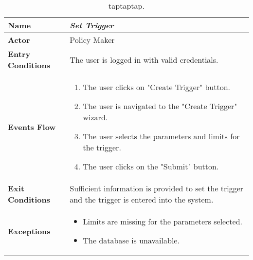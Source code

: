 
\begin{table}
\centering
\caption{\label{tab:addOne{table_counter}}taptaptap.}
\renewcommand{\arraystretch}{1.25}
\begin{tabular}{|l|>{\raggedright\arraybackslash}m{12cm}|}

    \hline
    \textbf{Name} & \textit{Set Trigger}\\
    \hline
   	\textbf{Actor} & Policy Maker\\
    \hline
    \textbf{Entry Conditions} & The user is logged in with valid credentials.\\
    \hline
    \textbf{Events Flow} & 
    \begin{enumerate}
	    \item The user clicks on "Create Trigger" button.
    	\item The user is navigated to the "Create Trigger" wizard.
    	\item The user selects the parameters and limits for the trigger.
    	\item The user clicks on the "Submit" button.
    \end{enumerate} \\ \hline
    \textbf{Exit Conditions} & Sufficient information is provided to set the trigger and the trigger is entered into the system.\\
    \hline
    \textbf{Exceptions} & \begin{itemize}
    	\item Limits are missing for the parameters selected.
    	\item The database is unavailable.
    \end{itemize}\\
    \hline
\end{tabular}
\end{table}